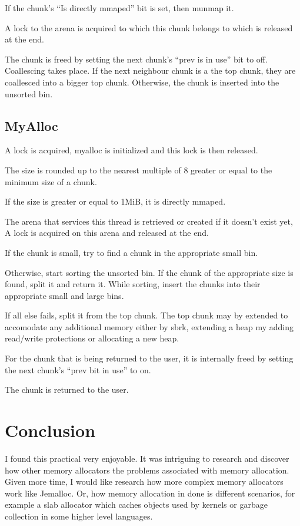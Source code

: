 \documentclass{article}
\begin{document}
If the chunk's ``Is directly mmaped'' bit is set, then munmap it.

A lock to the arena is acquired to which this chunk belongs to which is released at the end.

The chunk is freed by setting the next chunk's ``prev is in use'' bit to off. Coallescing takes place. If the next neighbour chunk is a the top chunk, they are coallesced into a bigger top chunk. Otherwise, the chunk is inserted into the unsorted bin.

\subsection{MyAlloc}

A lock is acquired, myalloc is initialized and this lock is then released.

The size is rounded up to the nearest multiple of 8 greater or equal to the minimum size of a chunk.

If the size is greater or equal to 1MiB, it is directly mmaped.

The arena that services this thread is retrieved or created if it doesn't exist yet, A lock is acquired on this arena and released at the end.

If the chunk is small, try to find a chunk in the appropriate small bin.

Otherwise, start sorting the unsorted bin. If the chunk of the appropriate size is found, split it and return it. While sorting, insert the chunks into their appropriate small and large bins.

If all else fails, split it from the top chunk. The top chunk may by extended to accomodate any additional memory either by sbrk, extending a heap my adding read/write protections or allocating a new heap.

For the chunk that is being returned to the user, it is internally freed by setting the next chunk's ``prev bit in use'' to on.

The chunk is returned to the user.

\section{Conclusion}

I found this practical very enjoyable. It was intriguing to research and discover how other memory allocators the problems associated with memory allocation. Given more time, I would like research how more complex memory allocators work like Jemalloc. Or, how memory allocation in done is different scenarios, for example a slab allocator which caches objects used by kernels or garbage collection in some higher level languages.
\end{document}
